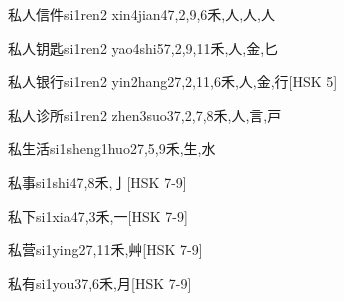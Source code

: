 \begin{EntryWithPhonetic}{私人信件}{si1ren2 xin4jian4}{7,2,9,6}{⽲,⼈,⼈,⼈}
\end{EntryWithPhonetic}

\begin{EntryWithPhonetic}{私人钥匙}{si1ren2 yao4shi5}{7,2,9,11}{⽲,⼈,⾦,⼔}
\end{EntryWithPhonetic}

\begin{EntryWithPhonetic}{私人银行}{si1ren2 yin2hang2}{7,2,11,6}{⽲,⼈,⾦,⾏}[HSK 5]
\end{EntryWithPhonetic}

\begin{EntryWithPhonetic}{私人诊所}{si1ren2 zhen3suo3}{7,2,7,8}{⽲,⼈,⾔,⼾}
\end{EntryWithPhonetic}

\begin{EntryWithPhonetic}{私生活}{si1sheng1huo2}{7,5,9}{⽲,⽣,⽔}
\end{EntryWithPhonetic}

\begin{EntryWithPhonetic}{私事}{si1shi4}{7,8}{⽲,⼅}[HSK 7-9]
\end{EntryWithPhonetic}

\begin{EntryWithPhonetic}{私下}{si1xia4}{7,3}{⽲,⼀}[HSK 7-9]
\end{EntryWithPhonetic}

\begin{EntryWithPhonetic}{私营}{si1ying2}{7,11}{⽲,⾋}[HSK 7-9]
\end{EntryWithPhonetic}

\begin{EntryWithPhonetic}{私有}{si1you3}{7,6}{⽲,⽉}[HSK 7-9]
\end{EntryWithPhonetic}

